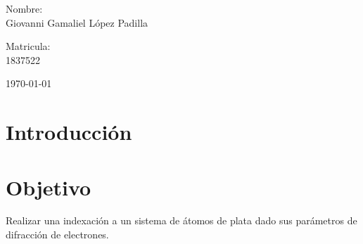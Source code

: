 \documentclass[reprint,amsmath,amssymb,aps,]{revtex4-2}
\begin{document}
\begin{titlepage}
\begin{center}
\begin{minipage}{0.6\linewidth}
\vspace{0.5cm}
\changefontsizes{14pt}
Nombre:\\
Giovanni Gamaliel López Padilla\\
\end{minipage}
\begin{minipage}{0.2\linewidth}
\changefontsizes{14pt}
Matricula:\\
1837522\\
\end{minipage}
\end{center}
\vspace{4cm}
\begin{flushright}
\today
\end{flushright}
\pagebreak
\end{titlepage}
\maketitle
\section{Introducción}
\section{Objetivo}
Realizar una indexación a un sistema de átomos de plata dado sus parámetros de difracción de electrones.
\end{document}
